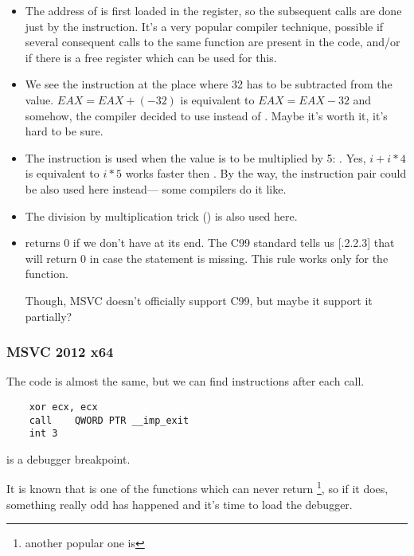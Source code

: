 \begin{itemize}
\item The address of \printf is first loaded in the 
\ESI register, so the subsequent
\printf calls are done just by the  instruction.
It's a very popular compiler 
technique, possible if several consequent calls to the same function are present
in the code, and/or if there is a free register which can be used for this.

\item We see the  
instruction at the place where 32 has to be subtracted from the value.
$EAX=EAX+(-32)$ is equivalent to $EAX=EAX-32$ 
and somehow, the compiler decided to use  instead of .
Maybe it's worth it, it's hard to be sure.

\item The \LEA instruction is used when 
the value is to be multiplied by 5: .
Yes, $i+i*4$ is equivalent to $i*5$ \AndENRU \LEA 
works faster then .
By the way, the  instruction pair could be also used here instead---
some compilers do it like.

\item The division by multiplication trick () 
is also used here.

\item \main returns 0 if we don't have  
at its end.
The C99 standard tells us [.2.2.3] that \main 
will return 0 in case the 
 statement is missing.
This rule works only for the \main function.

Though, MSVC doesn't officially support C99, but maybe it support it partially?
\end{itemize}

\subsubsection{\Optimizing MSVC 2012 x64}

The code is almost the same, but we can find  instructions after each  call.

\begin{lstlisting}
	xor	ecx, ecx
	call	QWORD PTR __imp_exit
	int	3
\end{lstlisting}

 is a debugger breakpoint.

It is known that  is one of the functions which can never return
\footnote{another popular one is },
so if it does, something really odd has happened and it's time to load the debugger.

